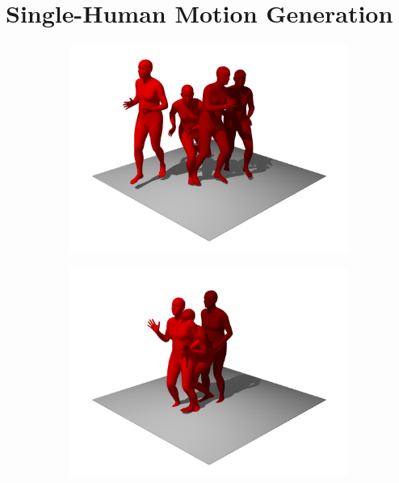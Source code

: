 \section*{Single-Human Motion Generation}
\begin{figure}[H]
    \centering
    \begin{subfigure}{0.32\linewidth}
        \includegraphics[width=\linewidth]{figures/results/single-kick1.png}
    \end{subfigure}
    \hfill
    \begin{subfigure}{0.32\linewidth}
        \includegraphics[width=\linewidth]{figures/results/single-kick2.png}
    \end{subfigure}
    \hfill
    \begin{subfigure}{0.32\linewidth}

\end{subfigure}
\end{figure}
